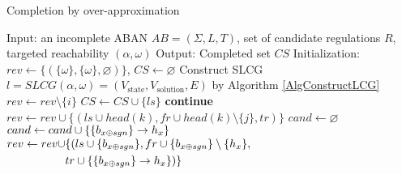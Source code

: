 \begin{algorithm}[ht]
\caption{Completion by over-approximation}\label{algComOver}
\begin{algorithmic}
\State Input: an incomplete ABAN $AB=(\Sigma, L,T)$, set of candidate regulations $R$, targeted reachability $(\alpha,\omega)$
\State Output: Completed set $CS$ %
\State Initialization: $rev\gets\{(\{\omega\},\{\omega\},\varnothing)\}$, $CS\gets \varnothing$
\State Construct SLCG $l=SLCG(\alpha,\omega)=(V_{\mathrm{state}},V_{\mathrm{solution}}, E)$ by Algorithm \ref{AlgConstructLCG}
\EndIf
{}
        \State $rev\gets rev \setminus\{i\}$
            \State $CS\gets CS\cup \{ls\}$
            \State \textbf{continue}
        \EndIf
                    \State $rev\gets rev\cup \{(ls\cup head(k), fr\cup head(k)\setminus \{j\},tr)\}$
                \EndIf
            \EndFor
        \EndFor
        \State $cand\gets\varnothing$
                \State $cand \gets cand\cup\{\acm{b_{x \oplus sgn}}{h_{1-x}}{h_x}\}$
                \State 
                    $\begin{aligned}
                        rev\gets rev\cup &\{(ls\cup \{b_{x \oplus sgn}\}, fr\cup \{b_{x \oplus sgn}\}\setminus \{h_x\},\\
                        &tr\cup\{\acm{b_{x \oplus sgn}}{h_{1-x}}{h_x}\})\}
                    \end{aligned}$
            \EndIf
        \EndFor
    \EndFor
\EndWhile
{}
\EndIf
{}
\end{algorithmic}
\end{algorithm}

